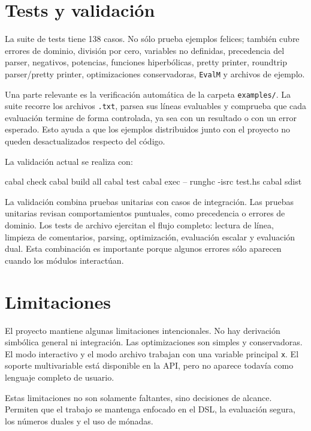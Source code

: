 \documentclass[11pt,a4paper]{article}
\newenvironment{lstlisting}{\verbatim}{\endverbatim}
\begin{document}
\section{Tests y validación}

La suite de tests tiene 138 casos. No sólo prueba ejemplos felices; también cubre errores de dominio, división por cero, variables no definidas, precedencia del parser, negativos, potencias, funciones hiperbólicas, pretty printer, roundtrip parser/pretty printer, optimizaciones conservadoras, \texttt{EvalM} y archivos de ejemplo.

Una parte relevante es la verificación automática de la carpeta \texttt{examples/}. La suite recorre los archivos \texttt{.txt}, parsea sus líneas evaluables y comprueba que cada evaluación termine de forma controlada, ya sea con un resultado o con un error esperado. Esto ayuda a que los ejemplos distribuidos junto con el proyecto no queden desactualizados respecto del código.

La validación actual se realiza con:

\begin{lstlisting}
cabal check
cabal build all
cabal test
cabal exec -- runghc -isrc test\TestSuite.hs
cabal sdist
\end{lstlisting}

La validación combina pruebas unitarias con casos de integración. Las pruebas unitarias revisan comportamientos puntuales, como precedencia o errores de dominio. Los tests de archivo ejercitan el flujo completo: lectura de línea, limpieza de comentarios, parsing, optimización, evaluación escalar y evaluación dual. Esta combinación es importante porque algunos errores sólo aparecen cuando los módulos interactúan.

\section{Limitaciones}

El proyecto mantiene algunas limitaciones intencionales. No hay derivación simbólica general ni integración. Las optimizaciones son simples y conservadoras. El modo interactivo y el modo archivo trabajan con una variable principal \texttt{x}. El soporte multivariable está disponible en la API, pero no aparece todavía como lenguaje completo de usuario.

Estas limitaciones no son solamente faltantes, sino decisiones de alcance. Permiten que el trabajo se mantenga enfocado en el DSL, la evaluación segura, los números duales y el uso de mónadas.
\end{document}
